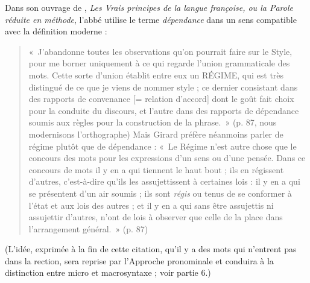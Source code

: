 {    Dans son ouvrage de \citeyear{girad1747vrais}, \textit{Les Vrais principes de la langue françoise, ou la Parole réduite en méthode}, l’abbé  utilise le terme \textit{dépendance} dans un sens compatible avec la définition moderne :
    \begin{quote}
    «~J’abandonne toutes les observations qu’on pourrait faire sur le Style, pour me borner uniquement à ce qui regarde l’union grammaticale des mots. Cette sorte d’union établit entre eux un RÉGIME, qui est très distingué de ce que je viens de nommer style ; ce dernier consistant dans des rapports de convenance [= relation d’accord] dont le goût fait choix pour la conduite du discours, et l’autre dans des rapports de dépendance soumis aux règles pour la construction de la phrase.~» (p. 87, nous modernisons l’orthographe) Mais Girard préfère néanmoins parler de régime plutôt que de dépendance : «~Le Régime n’est autre chose que le concours des mots pour les expressions d’un sens ou d’une pensée. Dans ce concours de mots il y en a qui tiennent le haut bout ; ils en régissent d’autres, c’est-à-dire qu’ils les assujettissent à certaines lois : il y en a qui se présentent d’un air soumis ; ils sont \textit{régis} ou tenus de se conformer à l’état et aux lois des autres ; et il y en a qui sans être assujettis ni assujettir d’autres, n’ont de lois à observer que celle de la place dans l’arrangement général.~» (p. 87)
    \end{quote}
  (L’idée, exprimée à la fin de cette citation, qu’il y a des mots qui n’entrent pas dans la rection, sera reprise par l’Approche pronominale et conduira à la distinction entre micro et macrosyntaxe ; voir partie 6.)

}
